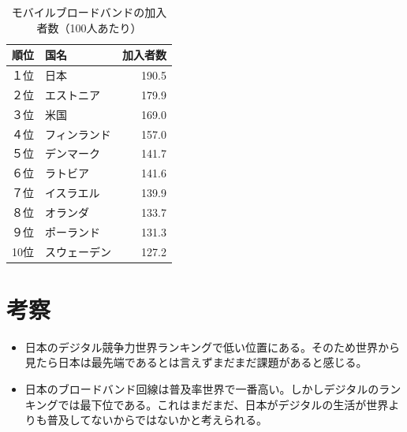 \documentclass[a4paper,11pt,dvipdfmx]{ujarticle}
\begin{document}
\begin{table}[htbp]
    \centering
    \caption{モバイルブロードバンドの加入者数（100人あたり）}\label{tbl:競争力ランキング}

    \begin{tabular}{|c|l|r|}
        \hline
        順位 & 国名 & 加入者数 \\
        \hline
        １位 & 日本 & 190.5 \\
        \hline
        ２位 & エストニア & 179.9 \\
        \hline
        ３位 & 米国 & 169.0 \\
        \hline
        ４位 & フィンランド & 157.0 \\
        \hline
        ５位 & デンマーク & 141.7 \\
        \hline
        ６位 & ラトビア & 141.6 \\
        \hline
        ７位 & イスラエル & 139.9 \\
        \hline
        ８位& オランダ & 133.7 \\
        \hline
        ９位 & ポーランド & 131.3 \\
        \hline
        10位 & スウェーデン & 127.2 \\
        \hline
    \end{tabular}
\end{table}

\section{考察}

\begin{itemize}
  \item 日本のデジタル競争力世界ランキングで低い位置にある。そのため世界から見たら日本は最先端であるとは言えずまだまだ課題があると感じる。
  \item 日本のブロードバンド回線は普及率世界で一番高い。しかしデジタルのランキングでは最下位である。これはまだまだ、日本がデジタルの生活が世界よりも普及してないからではないかと考えられる。
\end{itemize}



\end{document}
